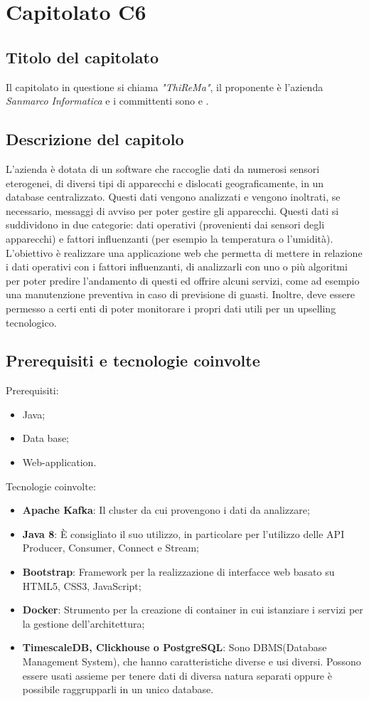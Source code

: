 \section{Capitolato C6}
\subsection{Titolo del capitolato}
Il capitolato in questione si chiama \textit{"ThiReMa"}, il proponente \`e l'azienda \textit{Sanmarco Informatica} e i committenti sono \VT{} e \CR{}.

\subsection{Descrizione del capitolo}
L'azienda \`e dotata di un software che raccoglie dati da numerosi sensori eterogenei, di diversi tipi di apparecchi e dislocati geograficamente, in un database centralizzato. Questi dati vengono analizzati e vengono inoltrati, se necessario, messaggi di avviso per poter gestire gli apparecchi. Questi dati si suddividono in due categorie: dati operativi (provenienti dai sensori degli apparecchi) e fattori influenzanti (per esempio la temperatura o l'umidità).
L'obiettivo \`e realizzare una applicazione web che permetta di mettere in relazione i dati operativi con i fattori influenzanti, di analizzarli con uno o più algoritmi per poter predire l'andamento di questi ed offrire alcuni servizi, come ad esempio una manutenzione preventiva in caso di previsione di guasti. Inoltre, deve essere permesso a certi enti di poter monitorare i propri dati utili per un upselling tecnologico.


\subsection{Prerequisiti e tecnologie coinvolte}
Prerequisiti:
\begin{itemize}
\item Java;	
\item Data base;
\item Web-application.
\end{itemize}
Tecnologie coinvolte:
\begin{itemize}
\item \textbf{Apache Kafka}: Il cluster da cui provengono i dati da analizzare;
\item \textbf{Java 8}: È consigliato il suo utilizzo, in particolare per l'utilizzo delle API Producer, Consumer, Connect e Stream;
\item \textbf{Bootstrap}: Framework per la realizzazione di interfacce web basato su HTML5, CSS3, JavaScript;
\item \textbf{Docker}: Strumento per la creazione di container in cui istanziare i servizi per la gestione dell'architettura;
\item \textbf{TimescaleDB, Clickhouse o PostgreSQL}: Sono DBMS(Database Management System), che hanno caratteristiche diverse e usi diversi. Possono essere usati assieme per tenere dati di diversa natura separati oppure \`e possibile raggrupparli in un unico database.
\end{itemize}


